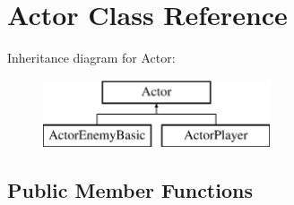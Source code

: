 \hypertarget{class_actor}{}\section{Actor Class Reference}
\label{class_actor}
Inheritance diagram for Actor\+:\begin{figure}[H]
\begin{center}
\leavevmode
\includegraphics[height=2.000000cm]{class_actor}
\end{center}
\end{figure}
\subsection*{Public Member Functions}

